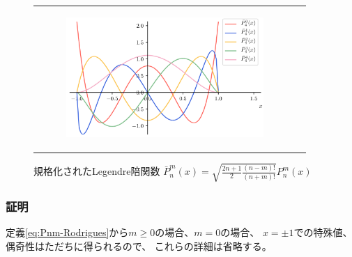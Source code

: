 \documentclass[../main/main]{subfiles}
\begin{document}
\begin{figure}[tb]
\begin{tabular}{cc}
 \begin{minipage}{0.50\hsize}
    \begin{figure}[H]
      \centering
      \includegraphics[width=75mm]{../fig/legendre/assoc_legendre4.png}
    \end{figure}
 \end{minipage}
\end{tabular}
\caption{規格化されたLegendre陪関数 
			$\bar{P}_n^m(x) = \sqrt{\frac{2n+1}{2} \frac{(n-m)!}{(n+m)!}} P_n^m(x)$}
\end{figure}


\subsubsection*{証明}
定義\eqref{eq:Pnm-Rodrigues}から$m\geq0$の場合、$m=0$の場合、
$x=\pm1$での特殊値、偶奇性はただちに得られるので、
これらの詳細は省略する。
\end{document}
